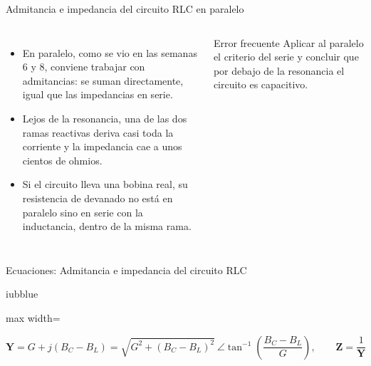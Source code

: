 \documentclass[aspectratio=169,11pt,xcolor={table}]{beamer}
\begin{document}
\begin{frame}{{\normalsize Admitancia e impedancia del circuito RLC en paralelo}}
\begin{columns}[c,onlytextwidth]
\small
\begin{itemize}\setlength{\itemsep}{4pt}
  \item En paralelo, como se vio en las semanas 6 y 8, conviene trabajar con admitancias: se suman directamente, igual que las impedancias en serie.
  \item Lejos de la resonancia, una de las dos ramas reactivas deriva casi toda la corriente y la impedancia cae a unos cientos de ohmios.
  \item Si el circuito lleva una bobina real, su resistencia de devanado no está en paralelo sino en serie con la inductancia, dentro de la misma rama.
\end{itemize}
\begin{cardO}{Error frecuente}
\footnotesize Aplicar al paralelo el criterio del serie y concluir que por debajo de la resonancia el circuito es capacitivo.
\end{cardO}
\end{columns}
\end{frame}

\begin{frame}{{\normalsize Ecuaciones: Admitancia e impedancia del circuito RLC}}
\begin{cajaplana}{iubblue}
\centering
\begin{adjustbox}{max width=\linewidth}
\begin{minipage}{1.40\linewidth}
{\large
\begin{equation*}
  \mathbf{Y} = G + j(B_C - B_L) = \sqrt{G^{2} + (B_C - B_L)^{2}}\ \angle \tan^{-1}\!\left(\frac{B_C - B_L}{G}\right), \qquad \mathbf{Z} = \frac{1}{\mathbf{Y}}
\end{equation*}
}
\end{minipage}
\end{adjustbox}
\end{cajaplana}
\end{frame}
\end{document}

